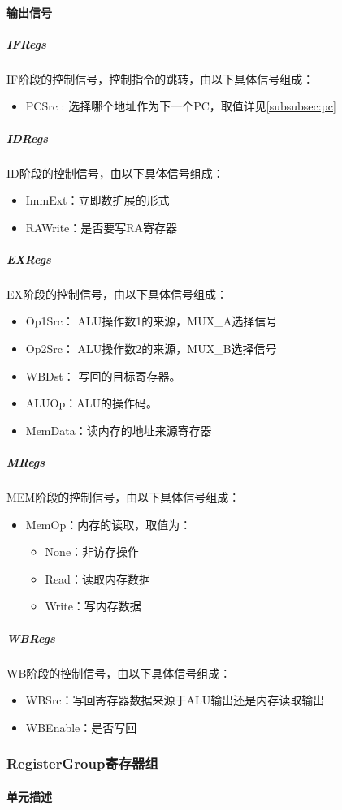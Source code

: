 \documentclass{article}
\begin{document}
\paragraph{输出信号}
\subparagraph{IFRegs}
IF阶段的控制信号，控制指令的跳转，由以下具体信号组成：
\begin{itemize}
	\item PCSrc : 选择哪个地址作为下一个PC，取值详见\ref{subsubsec:pc}
\end{itemize}
\subparagraph{IDRegs}
ID阶段的控制信号，由以下具体信号组成：
\begin{itemize}
	\item ImmExt：立即数扩展的形式
	\item RAWrite：是否要写RA寄存器
\end{itemize}
\subparagraph{EXRegs}
EX阶段的控制信号，由以下具体信号组成：
\begin{itemize}
	\item Op1Src： ALU操作数1的来源，MUX\_A选择信号
	\item Op2Src： ALU操作数2的来源，MUX\_B选择信号
	\item WBDst： 写回的目标寄存器。
	\item ALUOp：ALU的操作码。 
	\item MemData：读内存的地址来源寄存器
\end{itemize}
\subparagraph{MRegs}
MEM阶段的控制信号，由以下具体信号组成：
\begin{itemize}
	\item MemOp：内存的读取，取值为： 
		\begin{itemize}
			\item None：非访存操作
			\item Read：读取内存数据
			\item Write：写内存数据
		\end{itemize}
\end{itemize}

\subparagraph{WBRegs}
WB阶段的控制信号，由以下具体信号组成：
\begin{itemize}
	\item WBSrc：写回寄存器数据来源于ALU输出还是内存读取输出
	\item WBEnable：是否写回
\end{itemize}


\subsubsection{RegisterGroup寄存器组}

\paragraph{单元描述}
\end{document}
